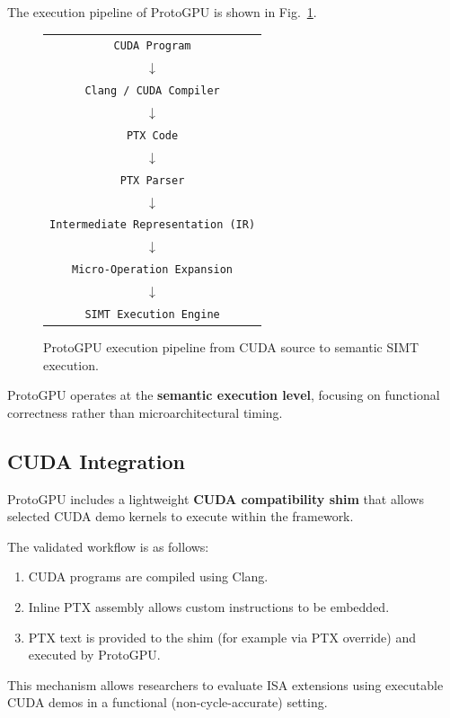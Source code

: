 \documentclass[11pt]{article}
\providecommand{\tightlist}{%
  \setlength{\itemsep}{0pt}\setlength{\parskip}{0pt}}
\begin{document}
The execution pipeline of ProtoGPU is shown in Fig.~\ref{fig:protogpu-pipeline}.

\begin{figure}[H]
\centering
\begin{tabular}{c}
\texttt{CUDA Program} \\
$\downarrow$ \\
\texttt{Clang / CUDA Compiler} \\
$\downarrow$ \\
\texttt{PTX Code} \\
$\downarrow$ \\
\texttt{PTX Parser} \\
$\downarrow$ \\
\texttt{Intermediate Representation (IR)} \\
$\downarrow$ \\
\texttt{Micro-Operation Expansion} \\
$\downarrow$ \\
\texttt{SIMT Execution Engine}
\end{tabular}
\caption{ProtoGPU execution pipeline from CUDA source to semantic SIMT execution.}
\label{fig:protogpu-pipeline}
\end{figure}

ProtoGPU operates at the \textbf{semantic execution level}, focusing on
functional correctness rather than microarchitectural timing.


\hypertarget{cuda-integration}{%
\subsection{CUDA Integration}\label{cuda-integration}}

ProtoGPU includes a lightweight \textbf{CUDA compatibility shim} that
allows selected CUDA demo kernels to execute within the framework.

The validated workflow is as follows:

\begin{enumerate}
\def\labelenumi{\arabic{enumi}.}
\tightlist
\item
  CUDA programs are compiled using Clang.
\item
  Inline PTX assembly allows custom instructions to be embedded.
\item
  PTX text is provided to the shim (for example via PTX override) and
  executed by ProtoGPU.
\end{enumerate}

This mechanism allows researchers to evaluate ISA extensions using
executable CUDA demos in a functional (non-cycle-accurate) setting.
\end{document}
